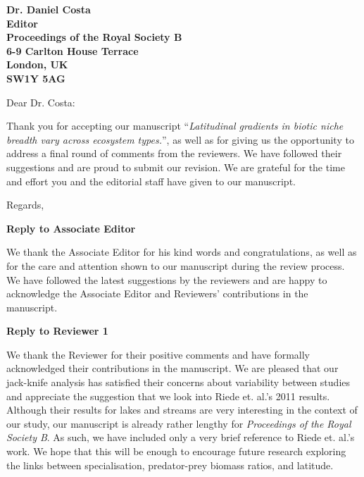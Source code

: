 \documentclass[12pt]{letter}
\newcommand{\mytitle}{\emph{Latitudinal gradients in biotic niche breadth vary across ecosystem types.}}
\newcommand{\myjournal}{\emph{Proceedings of the Royal Society B}}
\begin{document}
\begin{letter}{\bf Dr. Daniel Costa\\
               Editor\\
               Proceedings of the Royal Society B\\
               6-9 Carlton House Terrace\\
               London, UK\\
               SW1Y 5AG\\
                }

\opening{Dear Dr. Costa:}

Thank you for accepting our manuscript ``\mytitle'', as well as for giving us
the opportunity to address a final round of comments from the reviewers. We
have followed their suggestions and are proud to submit our revision.
We are grateful for the time and effort you and the editorial staff 
have given to our manuscript.


\closing{Regards,}


\end{letter}

\newpage

\setcounter{page}{1}


{\Large \bf Reply to Associate Editor}

  We thank the Associate Editor for his kind words and congratulations, as
  well as for the care and attention shown to our manuscript during the review
  process. We have followed the latest suggestions by the reviewers and are
  happy to acknowledge the Associate Editor and Reviewers' 
  contributions in the manuscript.


{\Large \bf Reply to Reviewer 1}

  We thank the Reviewer for their positive comments and have formally
  acknowledged their contributions in the manuscript. We are pleased that our
  jack-knife analysis has satisfied their concerns about variability between
  studies and appreciate the suggestion that we look into Riede et. al.'s 2011
  results. Although their results for lakes and streams are very interesting
  in the context of our study, our manuscript is already rather lengthy for
  \myjournal. As such, we have included only a very brief reference to Riede
  et. al.'s work. We hope that this will be enough to encourage future
  research exploring the links between specialisation, predator-prey biomass
  ratios, and latitude.
 
\end{document}
